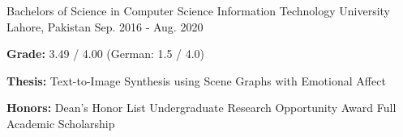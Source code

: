 

\begin{cventries}

  \cventry
    {Bachelors of Science in Computer Science} %
    {Information Technology University} %
    {Lahore, Pakistan} %
    {Sep. 2016 - Aug. 2020} %
    {
      \begin{cvitems} %
        \item \textbf{Grade: }3.49 / 4.00 (German: 1.5 / 4.0)
        \item \textbf{Thesis: }Text-to-Image Synthesis using Scene Graphs with Emotional Affect
        \item \textbf{Honors: } Dean's Honor List \quad\textbar\quad Undergraduate Research Opportunity Award \quad\textbar\quad Full Academic Scholarship
      \end{cvitems}
    }

\end{cventries}
